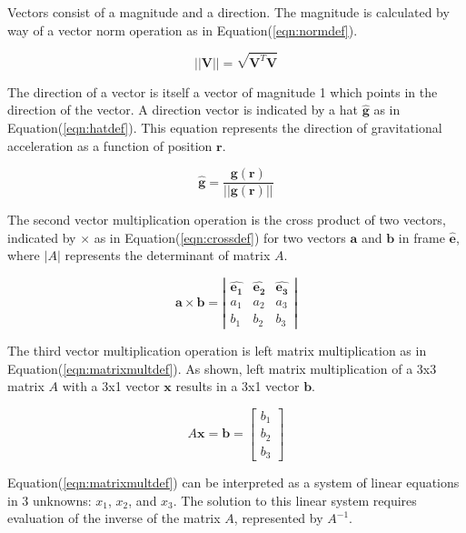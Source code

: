 Vectors consist of a magnitude and a direction. The magnitude is calculated by way of a vector norm operation as in Equation\:(\ref{eqn:normdef}).

\begin{equation}
\label{eqn:normdef}
||\bm{V}|| = \sqrt{\bm{V}^T\bm{V}}
\end{equation}

The direction of a vector is itself a vector of magnitude 1 which points in the direction of the vector. A direction vector is indicated by a hat $\hat{\bm{g}}$ as in Equation\:(\ref{eqn:hatdef}). This equation represents the direction of gravitational acceleration as a function of position $\bm{r}$.

\begin{equation}
\label{eqn:hatdef}
\hat{\bm{g}} = \frac{\bm{g(\bm{r})}}{||\bm{g(\bm{r})}||}
\end{equation}


The second vector multiplication operation is the cross product of two vectors, indicated by $\times$ as in Equation\:(\ref{eqn:crossdef}) for two vectors $\bm{a}$ and $\bm{b}$ in frame $\hat{\bm{e}}$, where $|A|$ represents the determinant of matrix $A$. 

\begin{equation}
\label{eqn:crossdef}
\bm{a}\times\bm{b} = 
\left|
\begin{matrix}
\hat{\bm{e_1}} & \hat{\bm{e_2}} & \hat{\bm{e_3}} \\
a_1 & a_2 & a_3 \\
b_1 & b_2 & b_3
\end{matrix}
\right|
\end{equation}


The third vector multiplication operation is left matrix multiplication as in Equation\:(\ref{eqn:matrixmultdef}). As shown, left matrix multiplication of a 3x3 matrix $A$ with a 3x1 vector $\bm{x}$ results in a 3x1 vector $\bm{b}$. 

\begin{equation}
\label{eqn:matrixmultdef}
A\bm{x} = \bm{b} =
\begin{bmatrix}
b_1 \\
b_2 \\
b_3
\end{bmatrix}
\end{equation}

Equation\:(\ref{eqn:matrixmultdef}) can be interpreted as a system of linear equations in 3 unknowns: $x_1$, $x_2$, and $x_3$. The solution to this linear system requires evaluation of the inverse of the matrix $A$, represented by $A^{-1}$. 

